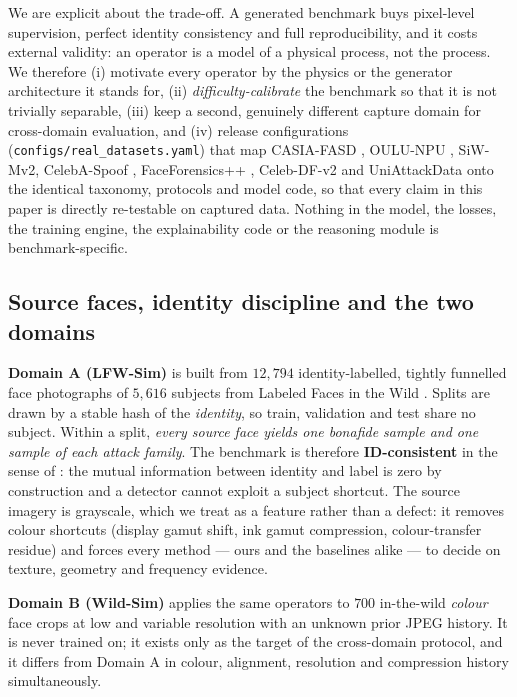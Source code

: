 \documentclass[conference]{IEEEtran}
\begin{document}
We are explicit about the trade-off. A generated benchmark buys pixel-level
supervision, perfect identity consistency and full reproducibility, and it costs
external validity: an operator is a model of a physical process, not the process.
We therefore (i) motivate every operator by the physics or the generator
architecture it stands for, (ii) \emph{difficulty-calibrate} the benchmark so that
it is not trivially separable, (iii) keep a second, genuinely different capture
domain for cross-domain evaluation, and (iv) release configurations
(\texttt{configs/real\_datasets.yaml}) that map CASIA-FASD \cite{zhang2012casia},
OULU-NPU \cite{boulkenafet2017oulu}, SiW-Mv2, CelebA-Spoof \cite{zhang2020celebaspoof},
FaceForensics++ \cite{rossler2019ff}, Celeb-DF-v2 \cite{li2020celebdf} and
UniAttackData \cite{yu2024unified} onto the identical taxonomy, protocols and
model code, so that every claim in this paper is directly re-testable on captured
data. Nothing in the model, the losses, the training engine, the explainability
code or the reasoning module is benchmark-specific.

\subsection{Source faces, identity discipline and the two domains}
\textbf{Domain A (LFW-Sim)} is built from $12{,}794$ identity-labelled, tightly
funnelled face photographs of $5{,}616$ subjects from Labeled Faces in the Wild
\cite{huang2007lfw}. Splits are drawn by a stable hash of the \emph{identity}, so
train, validation and test share no subject. Within a split, \emph{every source
face yields one bonafide sample and one sample of each attack family}. The
benchmark is therefore \textbf{ID-consistent} in the sense of \cite{yu2024unified}:
the mutual information between identity and label is zero by construction and a
detector cannot exploit a subject shortcut. The source imagery is grayscale, which
we treat as a feature rather than a defect: it removes colour shortcuts (display
gamut shift, ink gamut compression, colour-transfer residue) and forces every
method --- ours and the baselines alike --- to decide on texture, geometry and
frequency evidence.

\textbf{Domain B (Wild-Sim)} applies the same operators to $700$ in-the-wild
\emph{colour} face crops at low and variable resolution with an unknown prior JPEG
history. It is never trained on; it exists only as the target of the cross-domain
protocol, and it differs from Domain A in colour, alignment, resolution and
compression history simultaneously.
\end{document}
